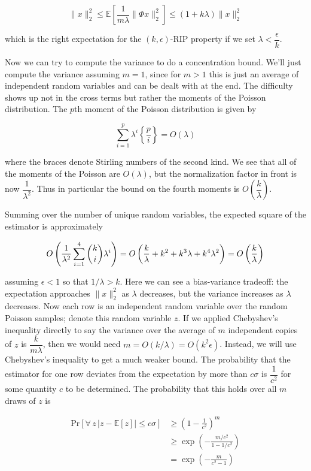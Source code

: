 \documentclass[english]{article}
\theoremstyle{plain}
\newcommand{\E}{\mathbb{E}}
\begin{document}
\[ \|x\|_2^2 \le \E\left[ \frac{1}{m\lambda} \|\Phi x\|_2^2 \right] \le (1+k\lambda)\|x\|_2^2\]

which is the right expectation for the $(k,\epsilon)$-RIP property if we set $\lambda < \dfrac{\epsilon}{k}$. 
	
Now we can try to compute the variance to do a concentration bound. We'll just compute the variance assuming $m=1$, since for $m > 1$ this is just an average of independent random variables and can be dealt with at the end. The difficulty shows up not in the cross terms but rather the moments of the Poisson distribution. The $p$th moment of the Poisson distribution is given by

\[\sum_{i=1}^p \lambda^i \left\{\frac{p}{i}\right\} = O(\lambda)\]

where the braces denote Stirling numbers of the second kind. We see that all of the moments of the Poisson are $O\left(\lambda\right)$, but the normalization factor in front is now $\dfrac{1}{\lambda^2}$. Thus in particular the bound on the fourth moments is $O\left(\dfrac{k}{\lambda}\right)$.

Summing over the number of unique random variables, the expected square of the estimator is approximately

\[O\left( \frac{1}{\lambda^2}\sum_{i=1}^4 \dbinom{k}{i}\lambda^i\right) = O\left( \frac{k}{\lambda} + k^2 + k^3 \lambda + k^4 \lambda^2 \right) = O\left(\frac{k}{\lambda}\right)\]

assuming $\epsilon < 1$ so that $1/\lambda > k$. Here we can see a bias-variance tradeoff: the expectation approaches $\|x\|_2^2$ as $\lambda$ decreases, but the variance increases as $\lambda$ decreases. Now each row is an independent random variable over the random Poisson samples; denote this random variable $z$. If we applied Chebyshev's inequality directly to say the variance over the average of $m$ independent copies of $z$ is $\dfrac{k}{m\lambda}$, then we would need $m = O(k/\lambda) = O(k^2\epsilon)$. Instead, we will use Chebyshev's inequality to get a much weaker bound. The probability that the estimator for one row deviates from the expectation by more than $c\sigma$ is $\dfrac{1}{c^2}$ for some quantity $c$ to be determined. The probability that this holds over all $m$ draws of $z$ is

\begin{align*}
	\text{Pr}\left[\forall \, z \, |z - \E[z]| \le c\sigma\right] &\ge \left(1 - \frac{1}{c^2}\right)^m\\
	&\ge \exp\left(-\frac{m/c^2}{1-1/c^2}\right)\\
	&= \exp\left(-\frac{m}{c^2-1}\right)
\end{align*}
\end{document}
